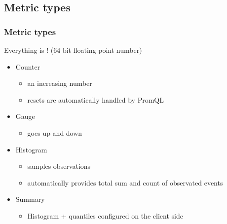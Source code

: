 \subsection{Metric types}
\begin{frame}
  \frametitle{Metric types}

  Everything is  ! {\small(64 bit floating point number)}
  
  \begin{itemize}
   \item<1-> Counter 
    \begin{itemize}
     \item an increasing number 
     \item resets are automatically handled by PromQL
    \end{itemize}

   \item<2-> Gauge
    \begin{itemize}
     \item goes up and down
    \end{itemize}

   \item<3-> Histogram
    \begin{itemize}
     \item samples observations
     \item automatically provides total sum and count of observated events
    \end{itemize}

   \item<4-> Summary
    \begin{itemize}
     \item Histogram + quantiles configured on the client side
    \end{itemize}

  \end{itemize}
\end{frame}

